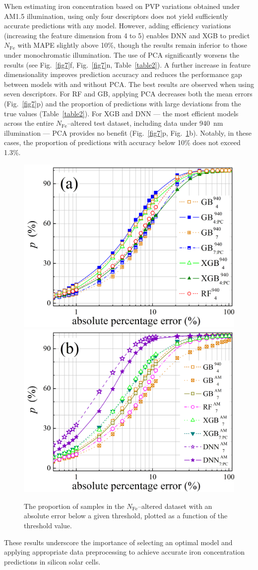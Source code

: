 \documentclass[a4paper,fleqn,draft]{cas-sc}
\begin{document}
When estimating iron concentration based on PVP variations obtained under AM1.5 illumination,
using only four descriptors does not yield sufficiently accurate predictions with any model.
However, adding efficiency variations (increasing the feature dimension from 4 to 5)
enables DNN and XGB to predict $N_\mathrm{Fe}$ with MAPE slightly above 10\%,
though the results remain inferior to those under monochromatic illumination.
The use of PCA significantly worsens the results (see Fig.~\ref{fig7}f, Fig.~\ref{fig7}n, Table~\ref{table2}).
A further increase in feature dimensionality improves prediction accuracy and reduces the performance gap between models with and without PCA.
The best results are observed when using seven descriptors.
For RF and GB, applying PCA decreases both the mean errors (Fig.~\ref{fig7}p)
and the proportion of predictions with large deviations from the true values (Table~\ref{table2}).
For XGB and DNN --- the most efficient models across the entire $N_\mathrm{Fe}$--altered test dataset,
including data under 940~nm illumination --- PCA provides no benefit (Fig.~\ref{fig7}p, Fig.~\ref{fig8}b).
Notably, in these cases, the proportion of predictions with accuracy below 10\% does not exceed 1.3\%.

\begin{figure}
  \centering
     \includegraphics[width=0.4\linewidth]{Fig8a.png}
     \includegraphics[width=0.4\linewidth]{Fig8b.png}
    \caption{The proportion of samples in the $N_\mathrm{Fe}$--altered dataset with an absolute error below a given threshold, plotted as a function of the threshold value.
}\label{fig8}
\end{figure}

These results underscore the importance of selecting an optimal model and applying appropriate data preprocessing
to achieve accurate iron concentration predictions in silicon solar cells.
\end{document}
